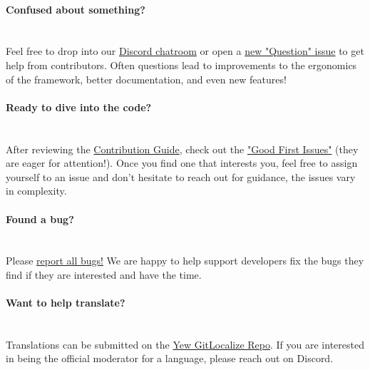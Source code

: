 \documentclass{article}
\begin{document}
\\
{\noindent \Large \textbf{Confused about something?}}\\\\
\\
Feel free to drop into our \href{https://discord.gg/VQck8X4}{Discord chatroom} or open a \href{https://github.com/yewstack/yew/issues/new/choose}{new "Question" issue} to get help from contributors. Often questions lead to improvements to the ergonomics of the framework, better documentation, and even new features!\\
\\
{\noindent \Large \textbf{Ready to dive into the code?}}\\\\
\\
After reviewing the \href{CONTRIBUTING.md}{Contribution Guide}, check out the \href{https://github.com/yewstack/yew/issues?q=is%3Aopen+is%3Aissue+label%3A%22good+first+issue%22}{"Good First Issues"} (they are eager for attention!). Once you find one that interests you, feel free to assign yourself to an issue and don't hesitate to reach out for guidance, the issues vary in complexity.\\
\\
{\noindent \Large \textbf{Found a bug?}}\\\\
\\
Please \href{https://github.com/yewstack/yew/issues/new/choose}{report all bugs!} We are happy to help support developers fix the bugs they find if they are interested and have the time.\\
\\
{\noindent \Large \textbf{Want to help translate?}}\\\\
\\
Translations can be submitted on the \href{https://gitlocalize.com/repo/7052}{Yew GitLocalize Repo}. If you are interested in being the official moderator for a language, please reach out on Discord.\\
\end{document}
